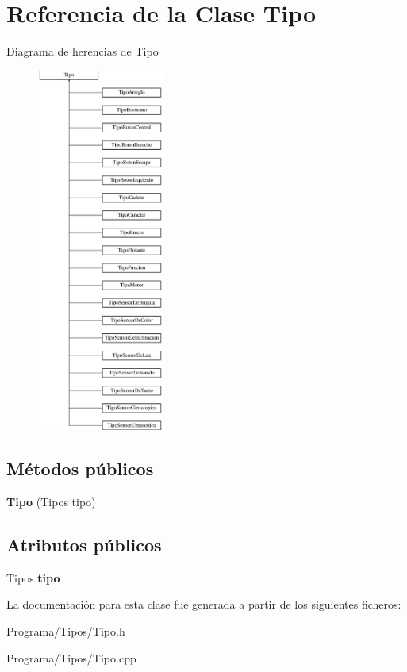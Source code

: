 \hypertarget{class_tipo}{\section{Referencia de la Clase Tipo}
\label{class_tipo}
}
Diagrama de herencias de Tipo\begin{figure}[H]
\begin{center}
\leavevmode
\includegraphics[height=12.000000cm]{class_tipo}
\end{center}
\end{figure}
\subsection*{Métodos públicos}
\begin{DoxyCompactItemize}
\item 
\hypertarget{class_tipo_afb62e2be23cab05bada0c0a94e0c1925}{{\bfseries Tipo} (Tipos tipo)}\label{class_tipo_afb62e2be23cab05bada0c0a94e0c1925}

\end{DoxyCompactItemize}
\subsection*{Atributos públicos}
\begin{DoxyCompactItemize}
\item 
\hypertarget{class_tipo_af707ea847ea3c1570a322cb8ad99ddf5}{Tipos {\bfseries tipo}}\label{class_tipo_af707ea847ea3c1570a322cb8ad99ddf5}

\end{DoxyCompactItemize}


La documentación para esta clase fue generada a partir de los siguientes ficheros\-:\begin{DoxyCompactItemize}
\item 
Programa/\-Tipos/Tipo.\-h\item 
Programa/\-Tipos/Tipo.\-cpp\end{DoxyCompactItemize}
